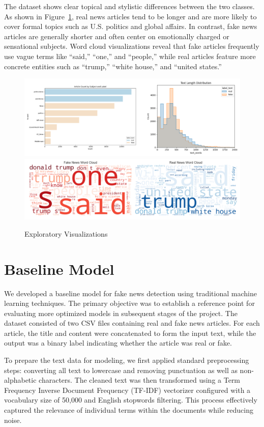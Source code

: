 \documentclass[11pt]{article}
\begin{document}
The dataset shows clear topical and stylistic differences between the two classes. As shown in Figure~\ref{fig:data}, real news articles tend to be longer and are more likely to cover formal topics such as U.S. politics and global affairs. In contrast, fake news articles are generally shorter and often center on emotionally charged or sensational subjects. Word cloud visualizations reveal that fake articles frequently use vague terms like “said,” “one,” and “people,” while real articles feature more concrete entities such as “trump,” “white house,” and “united states.”

\begin{figure}[H]
    \centering
    \includegraphics[width=0.9\linewidth]{length.png}
    \includegraphics[width=0.9\linewidth]{wordcloud.png}
    \caption{Exploratory Visualizations}
    \label{fig:data}
\end{figure}

\section{Baseline Model}
We developed a baseline model for fake news detection using traditional machine learning techniques. The primary objective was to establish a reference point for evaluating more optimized models in subsequent stages of the project. The dataset consisted of two CSV files containing real and fake news articles. For each article, the title and content were concatenated to form the input text, while the output was a binary label indicating whether the article was real or fake.

To prepare the text data for modeling, we first applied standard preprocessing steps: converting all text to lowercase and removing punctuation as well as non-alphabetic characters. The cleaned text was then transformed using a Term Frequency Inverse Document Frequency (TF-IDF) vectorizer configured with a vocabulary size of 50,000 and English stopwords filtering. This process effectively captured the relevance of individual terms within the documents while reducing noise.
\end{document}

